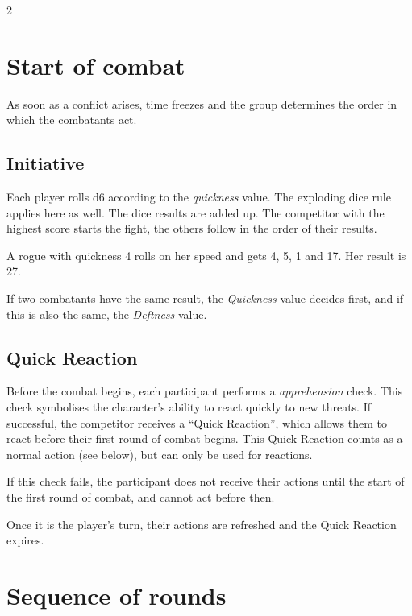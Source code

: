 \label{ch:combat}

\begin{multicols}{2}

\section{Start of combat}

As soon as a conflict arises, time freezes and the group determines the order in which the combatants act.

\subsection{Initiative}

Each player rolls d6 according to the \textit{quickness} value. The exploding dice rule applies here as well. The dice results are added up. The competitor with the highest score starts the fight, the others follow in the order of their results.

\begin{pexample}[Example]
A rogue with quickness 4 rolls on her speed and gets 4, 5, 1 and 17. Her result is 27.
\end{pexample}

If two combatants have the same result, the \textit{Quickness} value decides first, and if this is also the same, the \textit{Deftness} value.

\subsection{Quick Reaction}

Before the combat begins, each participant performs a \textit{apprehension} check. This check symbolises the character's ability to react quickly to new threats. If successful, the competitor receives a ``Quick Reaction'', which allows them to react before their first round of combat begins. This Quick Reaction counts as a normal action (see below), but can only be used for reactions.

If this check fails, the participant does not receive their actions until the start of the first round of combat, and cannot act before then.

Once it is the player's turn, their actions are refreshed and the Quick Reaction expires.

\section{Sequence of rounds}


\end{multicols}
